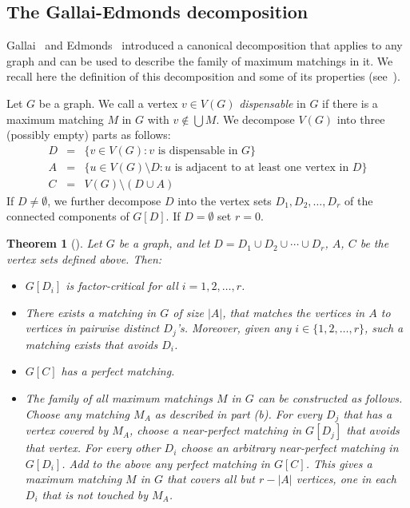 \documentclass[10pt,a4paper]{amsart}
\newtheorem{theorem}{Theorem}[section]
\begin{document}
\subsection{The Gallai-Edmonds decomposition}
Gallai~\cite{Ga63, Ga64} and Edmonds~\cite{Ed} introduced a canonical decomposition that applies to any graph and can be used to describe the family of maximum matchings in it. We recall here the definition of this decomposition and some of its properties (see~\cite[Theorem 3.2.1]{LP}).

Let $G$ be a graph. We call a vertex $v \in V(G)$ \emph{dispensable} in $G$ if there is a maximum matching $M$ in $G$ with $v \notin \bigcup M$. We decompose $V(G)$ into three (possibly empty) parts as follows:
\begin{eqnarray*}
D & = & \{ v \in V(G): v \textrm{ is dispensable in } G\} \\
A & = & \{ u \in V(G) \setminus D: u \textrm{ is adjacent to at least one vertex in } D\} \\
C & = & V(G) \setminus (D \cup A)
\end{eqnarray*}
If $D \ne \emptyset$, we further decompose $D$ into the vertex sets $D_1, D_2, \ldots , D_r$ of the connected components of $G[D]$. If $D = \emptyset$ set $r=0$.
\begin{theorem}[{\cite{Ga63, Ga64, Ed}}] \label{thm:GE}
Let $G$ be a graph, and let $D = D_1 \cup D_2 \cup \cdots \cup D_r$, $A$, $C$ be the vertex sets defined above. Then:
\begin{itemize}
    \item[(a)] $G[D_i]$ is factor-critical for all $i=1,2, \ldots , r$.
    \item[(b)] There exists a matching in $G$ of size $|A|$, that matches the vertices in $A$ to vertices in pairwise distinct $D_j$'s. Moreover, given any $i \in \{1,2, \ldots , r\}$, such a matching exists that avoids $D_i$.
    \item[(c)] $G[C]$ has a perfect matching.
    \item[(d)] The family of all maximum matchings $M$ in $G$ can be constructed as follows. Choose any matching $M_A$ as described in part (b). For every $D_j$ that has a vertex covered by $M_A$, choose a near-perfect matching in $G[D_j]$ that avoids that vertex. For every other $D_i$ choose an arbitrary near-perfect matching in $G[D_i]$. Add to the above any perfect matching in $G[C]$. This gives a maximum matching $M$ in $G$ that covers all but $r - |A|$ vertices, one in each $D_i$ that is not touched by $M_A$.
\end{itemize}
\end{theorem}
\end{document}
